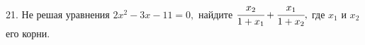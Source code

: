21. Не решая уравнения $2x^2-3x-11=0,$ найдите $\cfrac{x_2}{1+x_1}+\cfrac{x_1}{1+x_2},$ где $x_1$ и $x_2$ его корни.\\
